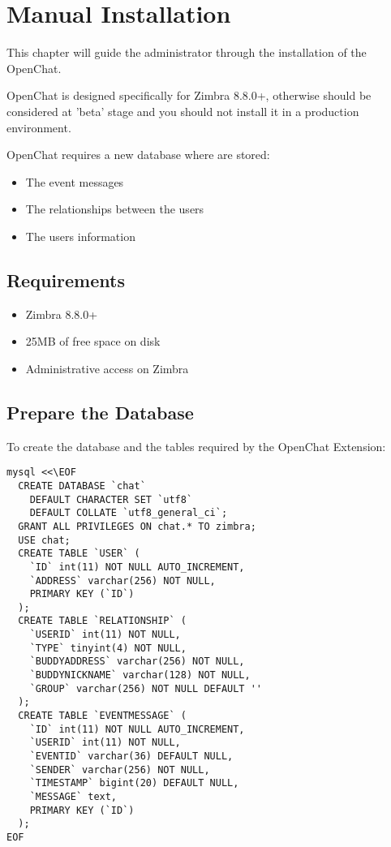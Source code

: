 \chapter{Manual Installation}

This chapter will guide the administrator through the installation of the OpenChat.

OpenChat is designed specifically for Zimbra 8.8.0+, otherwise should be considered at 'beta' stage and you should not install it in a production environment.

OpenChat requires a new database where are stored:
\begin{itemize}
\item The event messages
\item The relationships between the users
\item The users information
\end{itemize}

\section{Requirements}

\begin{itemize}
\item Zimbra 8.8.0+
\item 25MB of free space on disk
\item Administrative access on Zimbra
\end{itemize}

\section{Prepare the Database}
To create the database and the tables required by the OpenChat Extension:
\begin{verbatim}
mysql <<\EOF
  CREATE DATABASE `chat`
    DEFAULT CHARACTER SET `utf8`
    DEFAULT COLLATE `utf8_general_ci`;
  GRANT ALL PRIVILEGES ON chat.* TO zimbra;
  USE chat;
  CREATE TABLE `USER` (
    `ID` int(11) NOT NULL AUTO_INCREMENT,
    `ADDRESS` varchar(256) NOT NULL,
    PRIMARY KEY (`ID`)
  );
  CREATE TABLE `RELATIONSHIP` (
    `USERID` int(11) NOT NULL,
    `TYPE` tinyint(4) NOT NULL,
    `BUDDYADDRESS` varchar(256) NOT NULL,
    `BUDDYNICKNAME` varchar(128) NOT NULL,
    `GROUP` varchar(256) NOT NULL DEFAULT ''
  );
  CREATE TABLE `EVENTMESSAGE` (
    `ID` int(11) NOT NULL AUTO_INCREMENT,
    `USERID` int(11) NOT NULL,
    `EVENTID` varchar(36) DEFAULT NULL,
    `SENDER` varchar(256) NOT NULL,
    `TIMESTAMP` bigint(20) DEFAULT NULL,
    `MESSAGE` text,
    PRIMARY KEY (`ID`)
  );
EOF
\end{verbatim}

